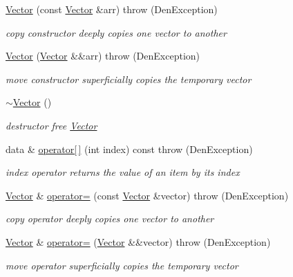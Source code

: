 \begin{DoxyCompactItemize}
\hyperlink{classVector_a7d21adde41c251063fb47f08fc07b870}{Vector} (const \hyperlink{classVector}{Vector} \&arr)  throw (\+Den\+Exception)
\begin{DoxyCompactList}\small\item\em copy constructor  deeply copies one vector to another \end{DoxyCompactList}\item 
\hyperlink{classVector_a729b947a5289bca0be614283775f0442}{Vector} (\hyperlink{classVector}{Vector} \&\&arr)  throw (\+Den\+Exception)
\begin{DoxyCompactList}\small\item\em move constructor  superficially copies the temporary vector \end{DoxyCompactList}\item 
\mbox{\label{classVector_afc7759d16cde34ac4a776b501906e0b0}} 
\hyperlink{classVector_afc7759d16cde34ac4a776b501906e0b0}{$\sim$\+Vector} ()
\begin{DoxyCompactList}\small\item\em destructor  free \hyperlink{classVector}{Vector} \end{DoxyCompactList}\item 
data \& \hyperlink{classVector_ad3af3ead835defe8350ec5ddb68d225b}{operator\mbox{[}$\,$\mbox{]}} (int index) const  throw (\+Den\+Exception)
\begin{DoxyCompactList}\small\item\em index operator  returns the value of an item by its index \end{DoxyCompactList}\item 
\hyperlink{classVector}{Vector} \& \hyperlink{classVector_adbc0fdf77e48a52048cb1a4bfc2393cc}{operator=} (const \hyperlink{classVector}{Vector} \&vector)  throw (\+Den\+Exception)
\begin{DoxyCompactList}\small\item\em copy operator  deeply copies one vector to another \end{DoxyCompactList}\item 
\hyperlink{classVector}{Vector} \& \hyperlink{classVector_a68301f908c4a063eb44487500480d314}{operator=} (\hyperlink{classVector}{Vector} \&\&vector)  throw (\+Den\+Exception)
\begin{DoxyCompactList}\small\item\em move operator  superficially copies the temporary vector \end{DoxyCompactList}\item 

\end{DoxyCompactItemize}
